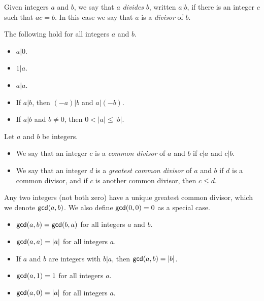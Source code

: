 \begin{dfn}[Divides]
Given integers \(a\) and \(b\), we say that \(a\) \emph{divides} \(b\), written \(a|b\), if there is an integer \(c\) such that \(ac = b\).
In this case we say that \(a\) is a \emph{divisor} of \(b\).
\end{dfn}

\begin{prop}
The following hold for all integers \(a\) and \(b\).
\begin{itemize}
\item \(a|0\).
\item \(1|a\).
\item \(a|a\).
\item If \(a|b\), then \((-a)|b\) and \(a|(-b)\).
\item If \(a|b\) and \(b \neq 0\), then \(0 < |a| \leq |b|\).
\end{itemize}
\end{prop}

\begin{dfn}
Let \(a\) and \(b\) be integers.
\begin{itemize}
\item We say that an integer \(c\) is a \emph{common divisor} of \(a\) and \(b\) if \(c|a\) and \(c|b\).
\item We say that an integer \(d\) is a \emph{greatest common divisor} of \(a\) and \(b\) if \(d\) is a common divisor, and if \(c\) is another common divisor, then \(c \leq d\).
\end{itemize}
\end{dfn}

\begin{prop}
Any two integers (not both zero) have a unique greatest common divisor, which we denote \(\mathsf{gcd}(a, b)\).
We also define \(\mathsf{gcd}(0, 0) = 0\) as a special case.
\end{prop}

\begin{prop} \mbox{}
\begin{itemize}
\item \(\mathsf{gcd}(a, b) = \mathsf{gcd}(b, a)\) for all integers \(a\) and \(b\).
\item \(\mathsf{gcd}(a, a) = |a|\) for all integers \(a\).
\item If \(a\) and \(b\) are integers with \(b|a\), then \(\mathsf{gcd}(a, b) = |b|\).
\item \(\mathsf{gcd}(a, 1) = 1\) for all integers \(a\).
\item \(\mathsf{gcd}(a, 0) = |a|\) for all integers \(a\).
\end{itemize}
\end{prop}

